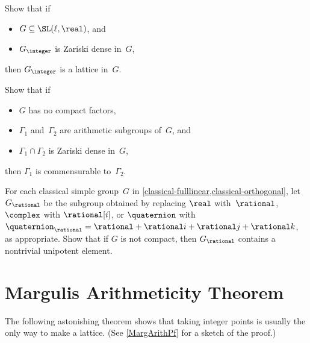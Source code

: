 \begin{exercises}
\item \label{GZzardense->latt}
 Show that if 
 \begin{itemize}
 \item $G \subseteq \SL(\ell,\real)$, and
 \item $G_{\integer}$ is Zariski dense in~$G$,
 \end{itemize}
 then $G_{\integer}$ is a lattice in~$G$.

\item \label{IntZarDense->EqualEx}
 Show that if 
 \begin{itemize}
 \item $G$ has no compact factors,
 \item $\Gamma_1$ and~$\Gamma_2$ are arithmetic subgroups
of~$G$, and
 \item $\Gamma_1 \cap \Gamma_2$ is Zariski dense in~$G$,
 \end{itemize}
 then $\Gamma_1$ is commensurable to~$\Gamma_2$.

\item \label{UnipInClassicalQ}
For each classical simple group~$G$ in \cref{classical-fulllinear,classical-orthogonal}, let $G_\rational$ be the subgroup obtained by replacing $\real$ with~$\rational$, $\complex$ with $\rational[i]$, or $\quaternion$ with $\quaternion_\rational = \rational + \rational i+ \rational j+ \rational k$, as appropriate. Show that if $G$ is not compact, then $G_\rational$ contains a nontrivial unipotent element.

\end{exercises}


\section{Margulis Arithmeticity Theorem}

The following astonishing theorem shows that taking integer
points is usually the only way to make a lattice. (See \cref{MargArithPf}
for a sketch of the proof.)

